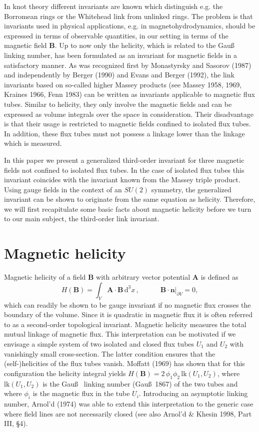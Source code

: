 \documentclass[10pt]{iopart}
\def \d{\mbox{d}}
\def \dxxx{\,\d^{3}\!x}
\def \text{\mbox}
\def \bA{{\mathbf{A}}}
\def \bB{{\mathbf{B}}}
\def \bn{{\mathbf{n}}}
\begin{document}
In knot theory different invariants are known which distinguish
e.g. the Borromean rings or the Whitehead link from unlinked
rings.
The problem is that invariants used in physical applications, e.g. in
magnetohydrodynamics, should be expressed in terms of observable
quantities, in our setting in terms of the magnetic field $\bB$.
Up to now only the helicity,
which is related to the Gau\ss~ linking number,
has been formulated as an invariant for magnetic fields in a
satisfactory manner.
As was recognized first by Monastyrsky and Sasorov (1987)
and independently by Berger (1990) and Evans and Berger (1992),
the link invariants based on so-called higher Massey products
(see Massey 1958, 1969, Kraines 1966, Fenn 1983)
can be written as invariants applicable to magnetic flux tubes.
Similar to helicity, they only involve the magnetic fields and can be
expressed as volume integrals over the space in consideration.
Their disadvantage is that their usage is restricted
to magnetic fields confined to isolated flux tubes.
In addition,
these flux tubes must not possess a linkage lower than the linkage
which is measured.

In this paper we present a generalized third-order invariant for three
magnetic fields not confined to isolated flux tubes. 
In the case of isolated flux tubes this invariant coincides with the
invariant known from the Massey triple product.
Using gauge
fields in the context of an $SU(2)$ symmetry, the generalized invariant can be
shown to originate from the same equation as helicity.
Therefore, we will first recapitulate some basic facts about
 magnetic helicity before we turn to our main subject, the third-order
link invariant.


\section{Magnetic helicity}
Magnetic helicity of a field $\bB$ with arbitrary vector potential $\bA$ 
is defined as
\begin{equation}
  H(\bB) = \int_V \bA \cdot \bB \dxxx\,,  \quad\quad\quad 
  \bB \cdot \bn|_{\partial V} =0,                  \label{heldef}
\end{equation}
which can readily be
shown to be gauge invariant
if no magnetic flux crosses the boundary of the volume.
Since it is quadratic in magnetic flux it is often referred to
as a second-order topological invariant.
Magnetic helicity measures the total mutual linkage
of magnetic flux.
This interpretation can be motivated if we envisage a simple system of two
isolated and  closed flux tubes $U_1$ and $U_2$ with vanishingly 
small cross-section. The latter condition ensures that the
(self-)helicities of the flux tubes vanish.
Moffatt (1969) has shown that for this configuration the
helicity integral yields 
$H(\bB) = 2\,\phi_1\phi_2\,\text{lk}(U_1,U_2)$,
where $\text{lk}(U_1,U_2)$ is the Gau\ss~ linking number (Gau\ss~1867) 
of the two tubes and where $\phi_i$ is the magnetic flux in the tube
$U_i$.
Introducing an asymptotic linking number,
Arnol'd (1974) was able to extend this 
interpretation to the
generic case where field lines are not necessarily closed
(see also Arnol'd \& Khesin 1998, Part III, \S4).
\end{document}
